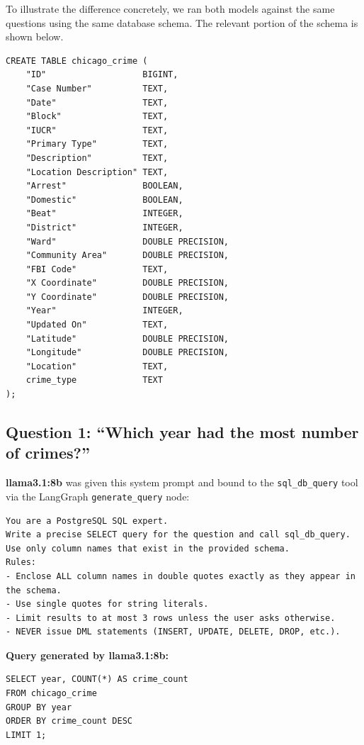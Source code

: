 \documentclass[12pt,a4paper]{article}
\begin{document}
To illustrate the difference concretely, we ran both models against the same questions
using the same database schema.  The relevant portion of the schema is shown below.

\begin{lstlisting}[style=sql, caption={Relevant schema (chicago\_crime table)}]
CREATE TABLE chicago_crime (
    "ID"                   BIGINT,
    "Case Number"          TEXT,
    "Date"                 TEXT,
    "Block"                TEXT,
    "IUCR"                 TEXT,
    "Primary Type"         TEXT,
    "Description"          TEXT,
    "Location Description" TEXT,
    "Arrest"               BOOLEAN,
    "Domestic"             BOOLEAN,
    "Beat"                 INTEGER,
    "District"             INTEGER,
    "Ward"                 DOUBLE PRECISION,
    "Community Area"       DOUBLE PRECISION,
    "FBI Code"             TEXT,
    "X Coordinate"         DOUBLE PRECISION,
    "Y Coordinate"         DOUBLE PRECISION,
    "Year"                 INTEGER,
    "Updated On"           TEXT,
    "Latitude"             DOUBLE PRECISION,
    "Longitude"            DOUBLE PRECISION,
    "Location"             TEXT,
    crime_type             TEXT
);
\end{lstlisting}

\subsection{Question 1: ``Which year had the most number of crimes?''}

\textbf{llama3.1:8b} was given this system prompt and bound to the
\texttt{sql\_db\_query} tool via the LangGraph \texttt{generate\_query} node:

\begin{lstlisting}[style=prompt, caption={System prompt delivered to llama3.1:8b}]
You are a PostgreSQL SQL expert.
Write a precise SELECT query for the question and call sql_db_query.
Use only column names that exist in the provided schema.
Rules:
- Enclose ALL column names in double quotes exactly as they appear in the schema.
- Use single quotes for string literals.
- Limit results to at most 3 rows unless the user asks otherwise.
- NEVER issue DML statements (INSERT, UPDATE, DELETE, DROP, etc.).
\end{lstlisting}

\noindent\textbf{Query generated by llama3.1:8b:}

\begin{lstlisting}[style=sql, caption={llama3.1:8b output for Question 1}]
SELECT year, COUNT(*) AS crime_count
FROM chicago_crime
GROUP BY year
ORDER BY crime_count DESC
LIMIT 1;
\end{lstlisting}
\end{document}
